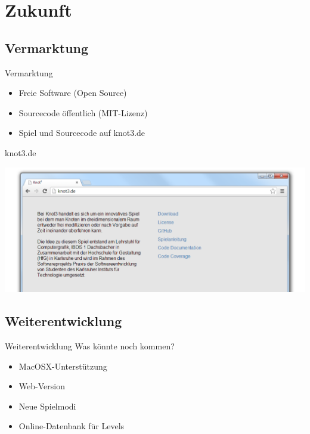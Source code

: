 \documentclass[18pt]{beamer}
\begin{document}



\section{Zukunft}
\subsection{Vermarktung}
\begin{frame}{Vermarktung}
\begin{itemize}
\item Freie Software (Open Source)
\item Sourcecode öffentlich (MIT-Lizenz)
\item Spiel und Sourcecode auf knot3.de

\end{itemize}

\end{frame}


\begin{frame}{knot3.de}
\begin{center}
\includegraphics[scale=0.44]{webseite}
\end{center}

\end{frame}

\subsection{Weiterentwicklung}
\begin{frame}{Weiterentwicklung}
Was könnte noch kommen?
\begin{itemize}
\item MacOSX-Unterstützung 
\item Web-Version
\item Neue Spielmodi
\item Online-Datenbank für Levels
\end{itemize}


\end{frame}
\end{document}
